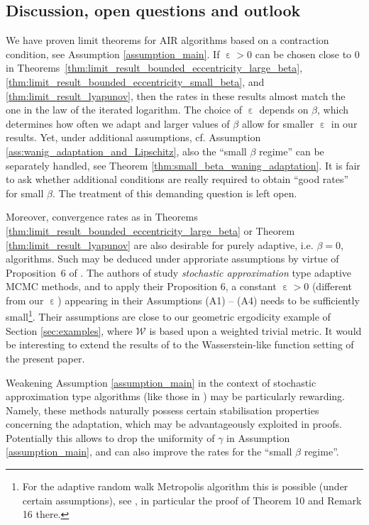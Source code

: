 \documentclass[12pt]{article}
\theoremstyle{definition}
\DeclareMathOperator{\eps}{\varepsilon}
\begin{document}
	\subsection{Discussion, open questions and outlook}
	We have proven limit theorems for AIR algorithms based on a contraction condition, see Assumption \ref{assumption_main}. 
	If $\eps >0$ can be chosen close to $0$ in Theorems~\ref{thm:limit_result_bounded_eccentricity_large_beta}, \ref{thm:limit_result_bounded_eccentricity_small_beta}, and \ref{thm:limit_result_lyapunov}, then the rates in these results almost match the one in the law of the iterated logarithm.
	The choice of $\eps$ depends on $\beta$, which determines how often we adapt and larger values of $\beta$ allow for smaller $\eps$ in our results. 
	Yet, under additional assumptions, cf. Assumption \ref{ass:wanig_adaptation_and_Lipschitz}, also the ``small $\beta$ regime'' can be separately handled, see Theorem \ref{thm:small_beta_waning_adaptation}. 
	It is fair to ask whether additional conditions are really required to obtain ``good rates'' for small $\beta$. 
	The treatment of this demanding question is left open.
	
	

	Moreover, convergence rates as in Theorems \ref{thm:limit_result_bounded_eccentricity_large_beta} or Theorem \ref{thm:limit_result_lyapunov} are also desirable for purely adaptive, i.e. $\beta=0$, algorithms.
	Such may be deduced under approriate assumptions by virtue of Proposition~6 of \cite{saksman2010ergodicity}.
	The authors of \cite{saksman2010ergodicity} study \textit{stochastic approximation} type adaptive MCMC methods, and to apply their Proposition 6, a constant $\eps>0$ (different from our $\eps$) appearing in their Assumptions (A1) -- (A4) needs to be sufficiently small\footnote{{For the adaptive random walk Metropolis algorithm this is possible (under certain assumptions), see \cite{saksman2010ergodicity}, in particular the proof of Theorem 10 and Remark 16 there.}}.
	Their assumptions are close to our geometric ergodicity example of Section \ref{sec:examples}, where $\mathcal{W}$ is based upon a weighted trivial metric. 
	It would be interesting  to extend the results of \cite{saksman2010ergodicity} to the Wasserstein-like function setting of the present paper. 
	
	{Weakening Assumption \ref{assumption_main} in the context of stochastic approximation type algorithms (like those in \cite{andrieu2006ergodicity,saksman2010ergodicity}) may be particularly rewarding.}
	Namely, these methods naturally possess certain stabilisation properties concerning the adaptation, which may be advantageously exploited in proofs.
	Potentially this allows	to drop the uniformity of $\gamma$ in Assumption \ref{assumption_main}, and can	also improve the rates for the ``small $\beta$ regime''. 
\end{document}
